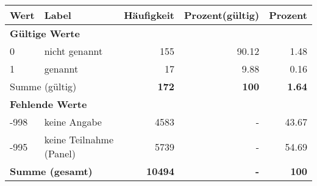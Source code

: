      \begin{longtable}{lXrrr}
     \toprule
     \textbf{Wert} & \textbf{Label} & \textbf{Häufigkeit} & \textbf{Prozent(gültig)} & \textbf{Prozent} \\
     \endhead
     \midrule
     \multicolumn{5}{l}{\textbf{Gültige Werte}}\\

     0 &
     \multicolumn{1}{X}{ nicht genannt   } &


       \num{155} &
       \num[round-mode=places,round-precision=2]{90,12} &
         \num[round-mode=places,round-precision=2]{1,48} \\

     1 &
     \multicolumn{1}{X}{ genannt   } &


       \num{17} &
       \num[round-mode=places,round-precision=2]{9,88} &
         \num[round-mode=places,round-precision=2]{0,16} \\
     \midrule
     \multicolumn{2}{l}{Summe (gültig)} &
       \textbf{\num{172}} &
     \textbf{100} &
       \textbf{\num[round-mode=places,round-precision=2]{1,64}} \\
     \multicolumn{5}{l}{\textbf{Fehlende Werte}}\\
       -998 &
       keine Angabe &
         \num{4583} &
        - &
         \num[round-mode=places,round-precision=2]{43,67} \\
       -995 &
       keine Teilnahme (Panel) &
         \num{5739} &
        - &
         \num[round-mode=places,round-precision=2]{54,69} \\
     \midrule
     \multicolumn{2}{l}{\textbf{Summe (gesamt)}} &
          \textbf{\num{10494}} &
        \textbf{-} &
        \textbf{100} \\
     \bottomrule
     \end{longtable}
     
